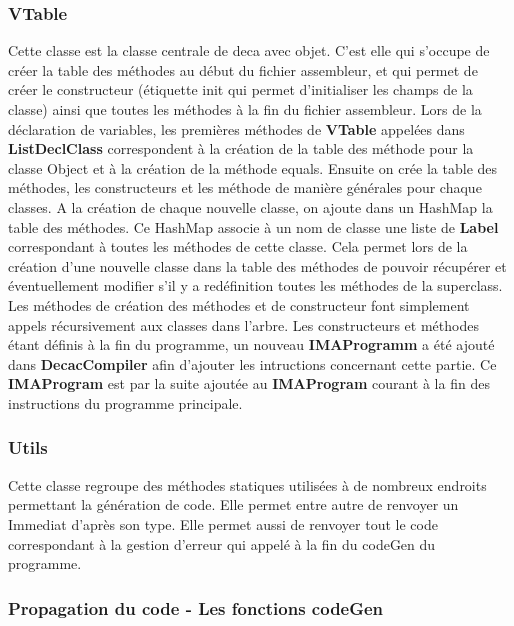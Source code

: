\documentclass[12pt, a4paper, one side]{article}
\begin{document}
    \subsubsection{VTable}

    Cette classe est la classe centrale de deca avec objet. C'est elle qui
    s'occupe de créer la table des méthodes au début du fichier assembleur,
    et qui permet de créer le constructeur (étiquette init qui permet
    d'initialiser les champs de la classe) ainsi que toutes les méthodes
    à la fin du fichier assembleur.
    Lors de la déclaration de variables, les premières méthodes de
    \textbf{VTable} appelées dans \textbf{ListDeclClass} correspondent à
    la création de la table des méthode pour la classe Object et à la création
    de la méthode equals. Ensuite on crée la table des méthodes, les
    constructeurs et les méthode de manière générales pour chaque classes.
    A la création de chaque nouvelle classe, on ajoute dans un HashMap la table
    des méthodes. Ce HashMap associe à un nom de classe une liste de
    \textbf{Label} correspondant à toutes les méthodes de cette classe. Cela
    permet lors de la création d'une nouvelle classe dans la table des méthodes
    de pouvoir récupérer et éventuellement modifier s'il y a redéfinition toutes
    les méthodes de la superclass. Les méthodes de création des méthodes et
    de constructeur font simplement appels récursivement aux classes dans
    l'arbre. Les constructeurs et méthodes étant définis à la fin du programme,
    un nouveau \textbf{IMAProgramm} a été ajouté dans \textbf{DecacCompiler}
    afin d'ajouter les intructions concernant cette partie. Ce
    \textbf{IMAProgram} est par la suite ajoutée au \textbf{IMAProgram} courant
    à la fin des instructions du programme principale.


    \subsubsection{Utils}

    Cette classe regroupe des méthodes statiques utilisées à de nombreux
    endroits permettant la génération
    de code. Elle permet entre autre de renvoyer un Immediat d'après son type.
    Elle permet aussi de renvoyer tout
    le code correspondant à la gestion d'erreur qui appelé à la fin du codeGen
    du programme.

    \subsubsection{Propagation du code - Les fonctions codeGen}
\end{document}
